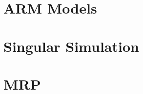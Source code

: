 \documentclass[12pt]{article}
\begin{document}

\section*{ARM Models}

\ARMTable{}

\ARMModelList{}

\ARMGraphZ{}

\ARMGraphDiff{}

\ARMGraphPostDiff{}


\section*{Singular Simulation}

\SingularResultsGraph{}


\section*{MRP}

\MRPGraph{}

\MRPMAPGraph{}

\MRPLMERGraph{}

\MRPLMERSdGraph{}
\end{document}
